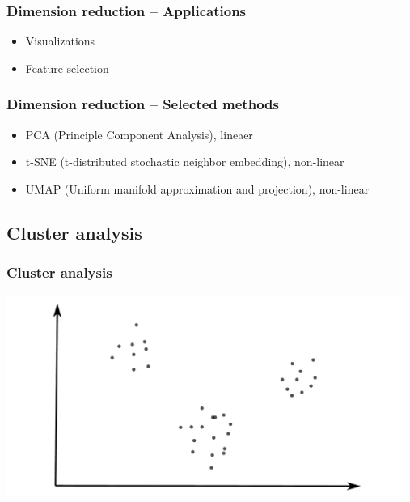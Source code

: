 \documentclass[aspectratio=169]{beamer}
\begin{document}
\begin{frame}
  \frametitle{Dimension reduction -- Applications}
  \begin{block}{}
    \begin{center}
      \begin{itemize}
      \item Visualizations
      \item Feature selection
      \end{itemize}
    \end{center}
  \end{block}
\end{frame}

\begin{frame}
  \frametitle{Dimension reduction -- Selected methods}
  \begin{block}{}
    \begin{center}
      \begin{itemize}
      \item PCA (Principle Component Analysis), lineaer
      \item t-SNE (t-distributed stochastic neighbor embedding), non-linear
      \item UMAP (Uniform manifold approximation and projection), non-linear
      \end{itemize}
    \end{center}
  \end{block}
\end{frame}

\subsection{Cluster analysis}

\setcounter{tocdepth}{2}
\begin{frame}{}
   \tableofcontents[currentsubsection,hideothersubsections,
     subsectionstyle=show/shaded]
\end{frame}

\begin{frame}
  \frametitle{Cluster analysis}
  \begin{center}
    \includegraphics[width=13.0cm]{images/clustering_1.pdf}
  \end{center}  
\end{frame}
\end{document}
